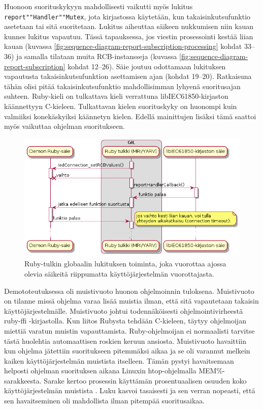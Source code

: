 Huonoon suorituskykyyn mahdollisesti vaikutti myös lukitus \texttt{report""Handler""Mutex}, jota kirjastossa käytetään, kun takaisinkutsufunktio asetetaan tai sitä suoritetaan. Lukitus aiheuttaa säikeen nukkumisen niin kauan kunnes lukitus vapautuu. Tässä tapauksessa, jos viestin prosessointi kestää liian kauan (kuvassa \ref{fig:sequence-diagram-report-subscription-processing} kohdat 33--36) ja samalla tilataan muita RCB-instansseja (kuvassa \ref{fig:sequence-diagram-report-subscription} kohdat 12--26). Säie joutuu odottamaan lukituksen vapautusta takaisinkutsufunktion asettamisen ajan (kohdat 19--20). Ratkaisuna tähän olisi pitää takaisinkutsufunktio mahdollisimman lyhyenä suoritusajan suhteen. Ruby-kieli on tulkattava kieli verrattuna libIEC61850-kirjaston käännettyyn C-kieleen. Tulkattavan kielen suorituskyky on huonompi kuin valmiiksi konekäskyiksi käännetyn kielen. Edellä mainittujen lisäksi tämä saattoi myös vaikuttaa ohjelman suoritukseen. \mbox{\cite{Kozlovski2017, Storimer2013}}

\begin{figure}[ht!]
	\includegraphics[width=1\textwidth]{pictures/ruby-gil.png}
	\caption{Ruby-tulkin globaalin lukituksen toiminta, joka vuorottaa ajossa olevia säikeitä riippumatta käyttöjärjestelmän vuorottajasta.}
	\label{fig:ruby-gil}
\end{figure}

Demototeutuksessa oli muistivuoto huonon ohjelmoinnin tuloksena. Muistivuoto on tilanne missä ohjelma varaa lisää muistia ilman, että sitä vapautetaan takaisin käyttöjärjestelmälle. Muistivuoto johtui todennäköisesti ohjelmointivirheestä ruby-ffi -kirjastolla. Kun liitos Rubysta tehdään C-kieleen, täytyy ohjelmoijan miettiä varatun muistin vapauttamista. Ruby-ohjelmoijan ei normaalisti tarvitse tästä huolehtia automaattisen roskien keruun ansiosta. Muistivuoto havaittiin kun ohjelma jätettiin suoritukseen pitemmäksi aikaa ja se oli varannut melkein kaiken käyttöjärjestelmän muistista itselleen. Tämän pystyi havaitsemaan helposti ohjelman suorituksen aikana Linuxin htop-ohjelmalla MEM\%-sarakkeesta. Sarake kertoo prosessin käyttämän prosentuaalisen osuuden koko käyttöjärjestelmän muistista \cite{htop-user-guide}. Luku kasvoi tasaisesti ja sen verran nopeasti, että sen havaitseminen oli mahdollista ilman pitempää suoritusaikaa.


